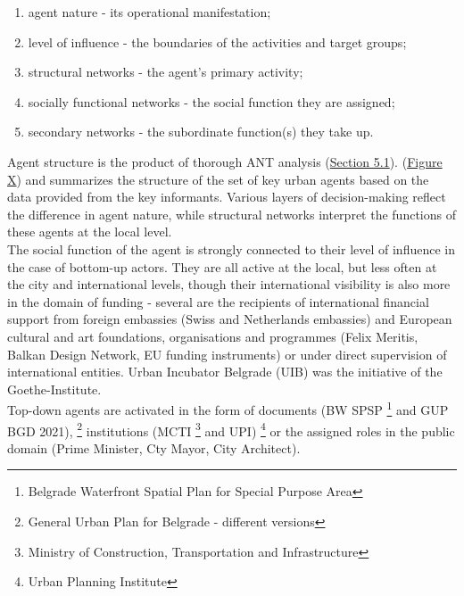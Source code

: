 \documentclass[11pt]{report}
\begin{document}
{{{{\begin{enumerate}
\item agent nature - its operational manifestation;
\item level of influence - the boundaries of the activities and target groups;
\item structural networks - the agent's primary activity;
\item socially functional networks - the social function they are assigned;
\item secondary networks - the subordinate function(s) they take up.
\end{enumerate}

Agent structure is the product of thorough ANT analysis (\href{Section 5.1}{Section 5.1}). 
(\href{FigureX}{Figure X})
and summarizes the structure of the set of key urban  agents based on the data provided from the key informants. Various layers of decision-making reflect the difference in agent nature, while structural networks interpret the functions of these agents at the local level.
\\

The social function of the agent is strongly connected to their level of influence in the case of bottom-up actors. They are all active at the local, but less often at the city and international levels, though their international visibility is also more in the domain of funding - several are the recipients of international financial support from foreign embassies (Swiss and Netherlands embassies) and European cultural and art foundations, organisations and programmes (Felix Meritis, Balkan Design Network, EU funding instruments) or under direct supervision of international entities. Urban Incubator Belgrade (UIB) was the initiative of  the Goethe-Institute.
\\

Top-down agents are activated in the form of documents (BW SPSP
\footnote{Belgrade Waterfront Spatial Plan for Special Purpose Area}
and GUP BGD 2021),
\footnote{General Urban Plan for Belgrade - different versions}
institutions (MCTI
\footnote{Ministry of Construction, Transportation and Infrastructure}
and UPI)
\footnote{Urban Planning Institute}
or the assigned roles in the public domain (Prime Minister, Cty Mayor, City Architect).
\\

}}}}
\end{document}
